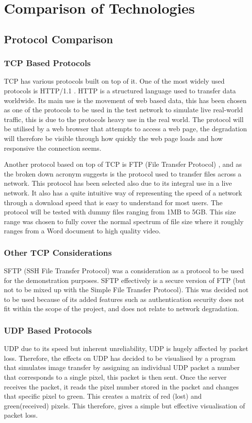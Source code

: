 \section{Comparison of Technologies}

\subsection{Protocol Comparison}
\subsubsection{TCP Based Protocols}
TCP has various protocols built on top of it. One of the most widely used protocols is HTTP/1.1 \citep{HTTP}. HTTP is a structured language used to transfer data worldwide. Its main use is the movement of web based data, this has been chosen as one of the protocols to be used in the test network to simulate live real-world traffic, this is due to the protocols heavy use in the real world. The protocol will be utilised by a web browser that attempts to access a web page, the degradation will therefore be visible through how quickly the web page loads and how responsive the connection seems.

Another protocol based on top of TCP is FTP (File Transfer Protocol) \citep{FTP}, and as the broken down acronym suggests is the protocol used to transfer files across a network. This protocol has been selected also due to its integral use in a live network. It also has a quite intuitive way of representing the speed of a network through a download speed that is easy to understand for most users. The protocol will be tested with dummy files ranging from 1MB to 5GB. This size range was chosen to fully cover the normal spectrum of file size where it roughly ranges from a Word document to high quality video.

\subsubsection{Other TCP Considerations}
SFTP (SSH File Transfer Protocol) \citep{SFTP} was a consideration as a protocol to be used for the demonstration purposes. SFTP effectively is a secure version of FTP (but not to be mixed up with the Simple File Transfer Protocol). This was decided not to be used because of its added features such as authentication security does not fit within the scope of the project, and does not relate to network degradation. 


\subsubsection{UDP Based Protocols}
UDP due to its speed but inherent unreliability, UDP is hugely affected by packet loss. Therefore, the effects on UDP has decided to be visualised by a program that simulates image transfer by assigning an individual UDP packet a number that corresponds to a single pixel, this packet is then sent. Once the server receives the packet, it reads the pixel number stored in the packet and changes that specific pixel to green. This creates a matrix of red (lost) and green(received) pixels. This therefore, gives a simple but effective visualisation of packet loss. 

